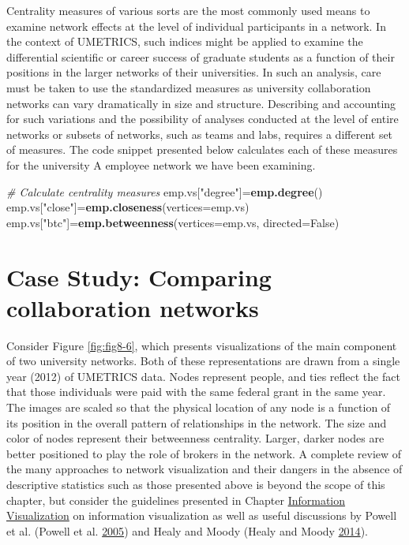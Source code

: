 \documentclass[]{krantz}
\newenvironment{Shaded}{\begin{snugshade}}{\end{snugshade}}
\newcommand{\KeywordTok}[1]{\textcolor[rgb]{0.13,0.29,0.53}{\textbf{#1}}}
\newcommand{\DataTypeTok}[1]{\textcolor[rgb]{0.13,0.29,0.53}{#1}}
\newcommand{\StringTok}[1]{\textcolor[rgb]{0.31,0.60,0.02}{#1}}
\newcommand{\CommentTok}[1]{\textcolor[rgb]{0.56,0.35,0.01}{\textit{#1}}}
\newcommand{\NormalTok}[1]{#1}
\begin{document}
Centrality measures of various sorts are the most commonly used means to
examine network effects at the level of individual participants in a
network. In the context of UMETRICS, such indices might be applied to
examine the differential scientific or career success of graduate
students as a function of their positions in the larger networks of
their universities. In such an analysis, care must be taken to use the
standardized measures as university collaboration networks can vary
dramatically in size and structure. Describing and accounting for such
variations and the possibility of analyses conducted at the level of
entire networks or subsets of networks, such as teams and labs, requires
a different set of measures. The code snippet presented below calculates
each of these measures for the university A employee network we have
been examining.

\begin{Shaded}
\begin{Highlighting}[]
\CommentTok{# Calculate centrality measures}
\NormalTok{emp.vs[}\StringTok{"degree"}\NormalTok{]=}\KeywordTok{emp.degree}\NormalTok{()}
\NormalTok{emp.vs[}\StringTok{"close"}\NormalTok{]=}\KeywordTok{emp.closeness}\NormalTok{(}\DataTypeTok{vertices=}\NormalTok{emp.vs)}
\NormalTok{emp.vs[}\StringTok{"btc"}\NormalTok{]=}\KeywordTok{emp.betweenness}\NormalTok{(}\DataTypeTok{vertices=}\NormalTok{emp.vs, }\DataTypeTok{directed=}\NormalTok{False)}
\end{Highlighting}
\end{Shaded}

\section{Case Study: Comparing collaboration
networks}\label{case-study-comparing-collaboration-networks}

Consider Figure \ref{fig:fig8-6}, which presents visualizations of the
main component of two university networks. Both of these representations
are drawn from a single year (2012) of UMETRICS data. Nodes represent
people, and ties reflect the fact that those individuals were paid with
the same federal grant in the same year. The images are scaled so that
the physical location of any node is a function of its position in the
overall pattern of relationships in the network. The size and color of
nodes represent their betweenness centrality. Larger, darker nodes are
better positioned to play the role of brokers in the network. A complete
review of the many approaches to network visualization and their dangers
in the absence of descriptive statistics such as those presented above
is beyond the scope of this chapter, but consider the guidelines
presented in Chapter \protect\hyperlink{chap:viz}{Information
Visualization} on information visualization as well as useful
discussions by Powell et al. (Powell et al.
\protect\hyperlink{ref-powell2005network}{2005}) and Healy and Moody
(Healy and Moody \protect\hyperlink{ref-healy2014data}{2014}).
\end{document}
